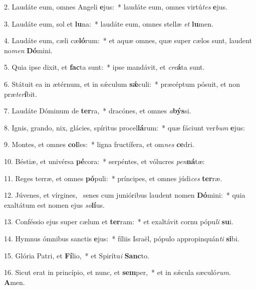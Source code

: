 2. Laudáte eum, omnes Angeli \textbf{e}jus:~*  laudáte eum, omnes virtú\textit{tes} \textbf{e}jus.\

3. Laudáte eum, sol et \textbf{lu}na:~*  laudáte eum, omnes stellæ \textit{et} \textbf{lu}men.\

4. Laudáte eum, cæli cæ\textbf{ló}rum:~*  et aquæ omnes, quæ super cælos sunt, laudent no\textit{men} \textbf{Dó}mini.\

5. Quia ipse dixit, et \textbf{fac}ta sunt:~*  ipse mandávit, et \textit{cre}\textbf{á}ta sunt.\

6. Státuit ea in ætérnum, et in sǽculum \textbf{sǽ}culi:~*  præcéptum pósuit, et non præ\textit{ter}\textbf{í}bit.\

7. Laudáte Dóminum de \textbf{ter}ra,~*  dracónes, et omnes \textit{a}\textbf{býs}si.\

8. Ignis, grando, nix, glácies, spíritus procel\textbf{lá}rum:~*  quæ fáciunt ver\textit{bum} \textbf{e}jus:\

9. Montes, et omnes \textbf{col}les:~*  ligna fructífera, et om\textit{nes} \textbf{ce}dri.\

10. Béstiæ, et univérsa \textbf{pé}cora:~*  serpéntes, et vólucres \textit{pen}\textbf{ná}tæ:\

11. Reges terræ, et omnes \textbf{pó}puli:~*  príncipes, et omnes júdi\textit{ces} \textbf{ter}ræ.\

12. Júvenes, et vírgines, \dag\  senes cum junióribus laudent nomen \textbf{Dó}mini:~*  quia exaltátum est nomen ejus \textit{so}\textbf{lí}us.\

13. Conféssio ejus super cælum et \textbf{ter}ram:~*  et exaltávit cornu pópu\textit{li} \textbf{su}i.\

14. Hymnus ómnibus sanctis \textbf{e}jus:~*  fíliis Israël, pópulo appropinquán\textit{ti} \textbf{si}bi.\

15. Glória Patri, et \textbf{Fí}lio,~*  et Spirítu\textit{i} \textbf{Sanc}to.\

16. Sicut erat in princípio, et nunc, et \textbf{sem}per,~*  et in sǽcula sæculó\textit{rum}. \textbf{A}men.\

